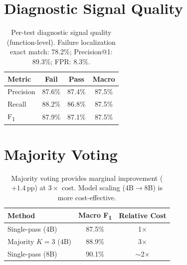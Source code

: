 \documentclass[11pt,a4paper]{article}
\newcommand{\fone}{F\textsubscript{1}}
\newcommand{\pp}{\,\text{pp}}
\begin{document}
\section{Diagnostic Signal Quality}

\begin{table}[h]
\centering
\small
\begin{tabular}{lccc}
\toprule
\textbf{Metric} & \textbf{Fail} & \textbf{Pass} & \textbf{Macro} \\
\midrule
Precision & 87.6\% & 87.4\% & 87.5\% \\
Recall & 88.2\% & 86.8\% & 87.5\% \\
\fone & 87.9\% & 87.1\% & 87.5\% \\
\bottomrule
\end{tabular}
\caption{Per-test diagnostic signal quality (function-level). Failure localization exact match: 78.2\%; Precision@1: 89.3\%; FPR: 8.3\%.}
\label{tab:diagnostic}
\end{table}

\section{Majority Voting}

\begin{table}[h]
\centering
\small
\begin{tabular}{lcc}
\toprule
\textbf{Method} & \textbf{Macro \fone} & \textbf{Relative Cost} \\
\midrule
Single-pass (4B) & 87.5\% & 1$\times$ \\
Majority $K{=}3$ (4B) & 88.9\% & 3$\times$ \\
Single-pass (8B) & 90.1\% & ${\sim}$2$\times$ \\
\bottomrule
\end{tabular}
\caption{Majority voting provides marginal improvement ($+1.4\pp$) at $3{\times}$ cost. Model scaling (4B$\to$8B) is more cost-effective.}
\label{tab:voting}
\end{table}
\end{document}
